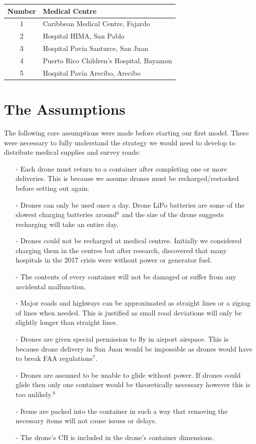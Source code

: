 \documentclass[a4paper,12pt]{article}
\begin{document}
\begin{center}
\begin{tabular}{ |c|l| }
 \hline
 Number & Medical Centre  \\\hline
 1 & Caribbean Medical Centre, Fajardo \\
 2 & Hospital HIMA, San Pablo \\
 3 & Hospital Pavia Santurce, San Juan \\
 4 & Puerto Rico Children's Hospital, Bayamon \\
 5 & Hospital Pavia Arecibo, Arecibo  \\
 \hline
\end{tabular}
\end{center}

\section{The Assumptions}
The following core assumptions were made before starting our first model. These were necessary to fully understand the strategy we would
need to develop to distribute medical supplies and survey roads:

\begin{itemize}
\item[-]Each drone must return to a container after completing one or more deliveries.
        This is because we assume drones must be recharged/restocked before setting out again.
\item[-]Drones can only be used once a day. Drone LiPo batteries are some of the slowest charging batteries around$^{6}$ and
        the size of the drone suggests recharging will take an entire day.
\item[-]Drones could not be recharged at medical centres.
        Initially we considered charging them in the centres but after research, discovered that
        many hospitals in the 2017 crisis were without power or generator fuel.
\item[-]The contents of every container will not be damaged or suffer from any accidental malfunction.
\item[-]Major roads and highways can be approximated as straight lines or a zigzag of lines when needed. This is justified as small road deviations will only be slightly longer than straight lines.
\item[-]Drones are given special permission to fly in airport airspace. This is because drone delivery in San Juan would be impossible as drones would have to break FAA regulations$^7$.
\item[-]Drones are assumed to be unable to glide without power. If drones could glide then only one container would be theoretically necessary however this is too unlikely.$^8$
\item[-]Items are packed into the container in such a way that removing the necessary items will not cause issues or delays.
\item[-]The drone's CB is included in the drone's container dimensions.
\end{itemize}
\end{document}
